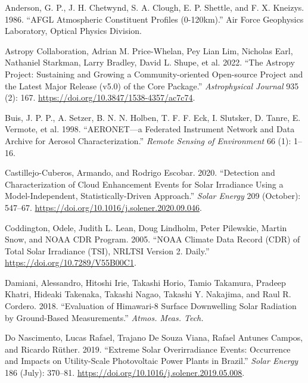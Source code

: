\documentclass[
  preprint, 3p, authoryear]{article}
\newlength{\cslhangindent}
\newlength{\cslentryspacingunit} %
\newenvironment{CSLReferences}[2] %
 {%
  \setlength{\parindent}{0pt}
  \ifodd #1
  \let\oldpar\par
  \def\par{\hangindent=\cslhangindent\oldpar}
  \fi
  \setlength{\parskip}{#2\cslentryspacingunit}
 }%
 {}
\begin{document}
\hypertarget{refs}{}
\begin{CSLReferences}{1}{0}
\leavevmode{}%
Anderson, G. P., J. H. Chetwynd, S. A. Clough, E. P. Shettle, and F. X. Kneizys. 1986. {``{AFGL} Atmospheric Constituent Profiles (0-120km).''} Air Force Geophysics Laboratory, Optical Physics Division.

\leavevmode{}%
Astropy Collaboration, Adrian M. Price-Whelan, Pey Lian Lim, Nicholas Earl, Nathaniel Starkman, Larry Bradley, David L. Shupe, et al. 2022. {``{The Astropy Project: Sustaining and Growing a Community-oriented Open-source Project and the Latest Major Release (v5.0) of the Core Package}.''} \emph{Astrophysical Journal} 935 (2): 167. \url{https://doi.org/10.3847/1538-4357/ac7c74}.

\leavevmode{}%
Buis, J. P. P., A. Setzer, B. N. N. Holben, T. F. F. Eck, I. Slutsker, D. Tanre, E. Vermote, et al. 1998. {``AERONET---a Federated Instrument Network and Data Archive for Aerosol Characterization.''} \emph{Remote Sensing of Environment} 66 (1): 1--16.

\leavevmode{}%
Castillejo-Cuberos, Armando, and Rodrigo Escobar. 2020. {``Detection and Characterization of Cloud Enhancement Events for Solar Irradiance Using a Model-Independent, Statistically-Driven Approach.''} \emph{Solar Energy} 209 (October): 547--67. \url{https://doi.org/10.1016/j.solener.2020.09.046}.

\leavevmode{}%
Coddington, Odele, Judith L. Lean, Doug Lindholm, Peter Pilewskie, Martin Snow, and NOAA CDR Program. 2005. {``{NOAA} Climate Data Record ({CDR}) of Total Solar Irradiance ({TSI}), {NRLTSI} Version 2. {D}aily.''} \url{https://doi.org/10.7289/V55B00C1}.

\leavevmode{}%
Damiani, Alessandro, Hitoshi Irie, Takashi Horio, Tamio Takamura, Pradeep Khatri, Hideaki Takenaka, Takashi Nagao, Takashi Y. Nakajima, and Raul R. Cordero. 2018. {``Evaluation of Himawari-8 Surface Downwelling Solar Radiation by Ground-Based Measurements.''} \emph{Atmos. Meas. Tech.}

\leavevmode{}%
Do Nascimento, Lucas Rafael, Trajano De Souza Viana, Rafael Antunes Campos, and Ricardo Rüther. 2019. {``Extreme Solar Overirradiance Events: Occurrence and Impacts on Utility-Scale Photovoltaic Power Plants in Brazil.''} \emph{Solar Energy} 186 (July): 370--81. \url{https://doi.org/10.1016/j.solener.2019.05.008}.


\end{CSLReferences}
\end{document}
